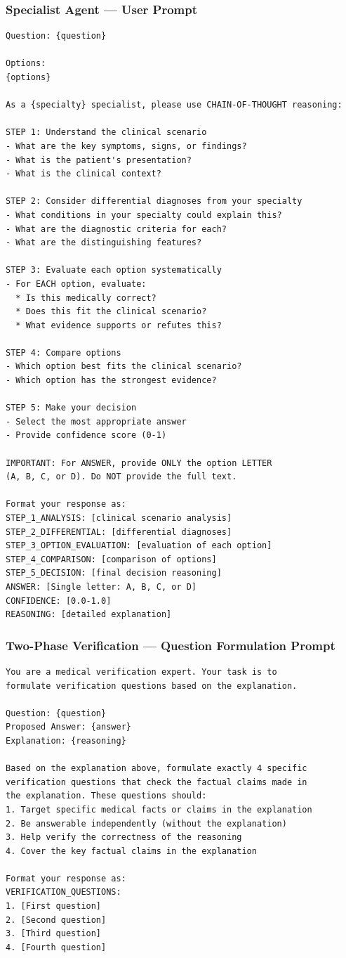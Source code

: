 \documentclass[10pt]{article}
\begin{document}
\subsubsection*{Specialist Agent — User Prompt}

\begin{verbatim}
Question: {question}

Options:
{options}

As a {specialty} specialist, please use CHAIN-OF-THOUGHT reasoning:

STEP 1: Understand the clinical scenario
- What are the key symptoms, signs, or findings?
- What is the patient's presentation?
- What is the clinical context?

STEP 2: Consider differential diagnoses from your specialty
- What conditions in your specialty could explain this?
- What are the diagnostic criteria for each?
- What are the distinguishing features?

STEP 3: Evaluate each option systematically
- For EACH option, evaluate:
  * Is this medically correct?
  * Does this fit the clinical scenario?
  * What evidence supports or refutes this?

STEP 4: Compare options
- Which option best fits the clinical scenario?
- Which option has the strongest evidence?

STEP 5: Make your decision
- Select the most appropriate answer
- Provide confidence score (0-1)

IMPORTANT: For ANSWER, provide ONLY the option LETTER
(A, B, C, or D). Do NOT provide the full text.

Format your response as:
STEP_1_ANALYSIS: [clinical scenario analysis]
STEP_2_DIFFERENTIAL: [differential diagnoses]
STEP_3_OPTION_EVALUATION: [evaluation of each option]
STEP_4_COMPARISON: [comparison of options]
STEP_5_DECISION: [final decision reasoning]
ANSWER: [Single letter: A, B, C, or D]
CONFIDENCE: [0.0-1.0]
REASONING: [detailed explanation]
\end{verbatim}

\subsubsection*{Two-Phase Verification — Question Formulation Prompt}

\begin{verbatim}
You are a medical verification expert. Your task is to
formulate verification questions based on the explanation.

Question: {question}
Proposed Answer: {answer}
Explanation: {reasoning}

Based on the explanation above, formulate exactly 4 specific
verification questions that check the factual claims made in
the explanation. These questions should:
1. Target specific medical facts or claims in the explanation
2. Be answerable independently (without the explanation)
3. Help verify the correctness of the reasoning
4. Cover the key factual claims in the explanation

Format your response as:
VERIFICATION_QUESTIONS:
1. [First question]
2. [Second question]
3. [Third question]
4. [Fourth question]
\end{verbatim}
\end{document}

